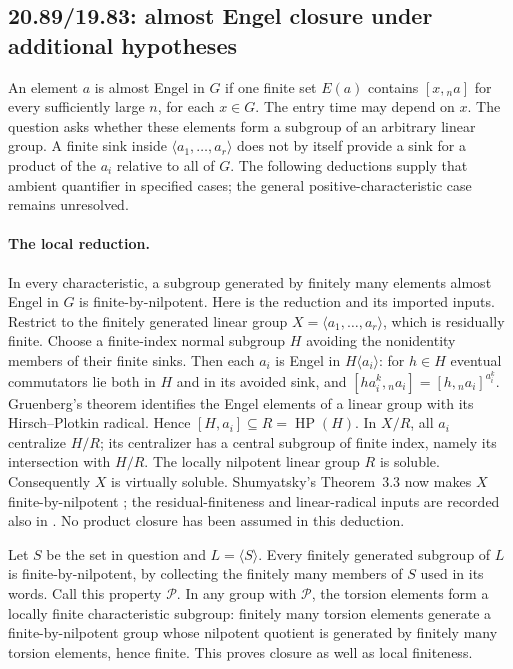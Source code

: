 \subsection{20.89/19.83: almost Engel closure under additional hypotheses}
\label{partial:engel}

An element \(a\) is almost Engel in \(G\) if one finite set \(E(a)\)
contains \([x,{}_n a]\) for every sufficiently large \(n\), for
each \(x\in G\). The entry time may depend on \(x\).
The question asks whether these elements form a subgroup of an
arbitrary linear group. A finite sink inside
\(\langle a_1,\ldots,a_r\rangle\) does not by itself provide a
sink for a product of the \(a_i\) relative to all of \(G\).
The following deductions supply that ambient quantifier in
specified cases; the general positive-characteristic case remains
unresolved.

\paragraph{The local reduction.}
In every characteristic, a subgroup generated by finitely many
elements almost Engel in \(G\) is finite-by-nilpotent.
Here is the reduction and its imported inputs.
Restrict to the finitely generated linear group
\(X=\langle a_1,\ldots,a_r\rangle\), which is residually finite.
Choose a finite-index normal subgroup \(H\) avoiding the
nonidentity members of their finite sinks. Then each \(a_i\)
is Engel in \(H\langle a_i\rangle\): for \(h\in H\) eventual
commutators lie both in \(H\) and in its avoided sink, and
\([ha_i^k,{}_n a_i]=[h,{}_n a_i]^{a_i^k}\).
Gruenberg's theorem identifies the Engel elements of a linear
group with its Hirsch--Plotkin radical. Hence
\([H,a_i]\subseteq R=\operatorname{HP}(H)\).
In \(X/R\), all \(a_i\) centralize \(H/R\); its centralizer has
a central subgroup of finite index, namely its intersection
with \(H/R\). The locally nilpotent linear group \(R\) is soluble.
Consequently \(X\) is virtually soluble.
Shumyatsky's Theorem~3.3 now makes \(X\) finite-by-nilpotent
\cite{shumyatsky-engel}; the residual-finiteness and
linear-radical inputs are recorded also in
\cite{wehrfritz-engel}.
No product closure has been assumed in this deduction.

Let \(S\) be the set in question and \(L=\langle S\rangle\).
Every finitely generated subgroup of \(L\) is finite-by-nilpotent,
by collecting the finitely many members of \(S\) used in its words.
Call this property \(\mathcal P\).
In any group with \(\mathcal P\), the torsion elements form a
locally finite characteristic subgroup: finitely many torsion
elements generate a finite-by-nilpotent group whose nilpotent
quotient is generated by finitely many torsion elements, hence
finite. This proves closure as well as local finiteness.


